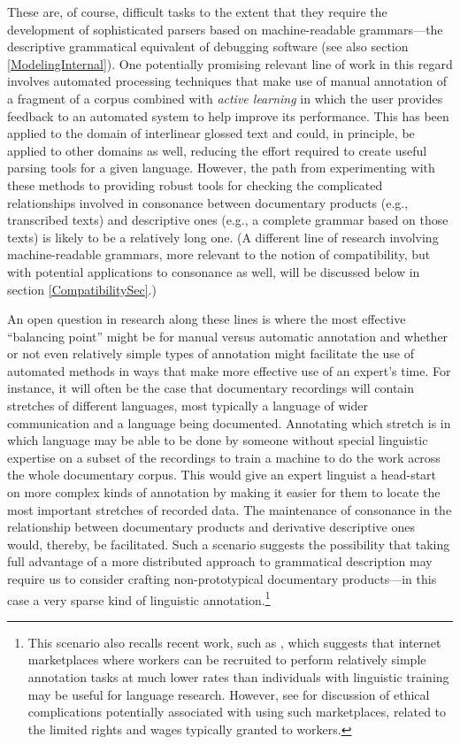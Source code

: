 \documentclass[12pt]{article}
\newcommand{\sref}[1]{section \ref{#1}}
\newcommand\namecite{\citet}
\renewcommand\cite{\citep}
\begin{document}
These are, of course, difficult tasks to the extent that they require the
development of sophisticated parsers based on machine-readable grammars---the
descriptive grammatical equivalent of debugging software (see also
\sref{ModelingInternal}). One potentially promising relevant line of work in
this regard involves automated processing techniques that make use of manual
annotation of a fragment of a corpus combined with \emph{active learning} in
which the user provides feedback to an automated system to help improve its
performance. This has been applied to the domain of interlinear glossed text
\cite{BaldridgePalmer:2009,PalmerEtAl:2009,Palmer:2009,PalmerEtAl:2010} and
could, in principle, be applied to other domains as well, reducing the effort
required to create useful parsing tools for a given language. However, the path
from experimenting with these methods to providing robust tools for checking the
complicated relationships involved in consonance between documentary products
(e.g., transcribed texts) and descriptive ones (e.g., a complete grammar based
on those texts) is likely to be a relatively long one. (A different line of
research involving machine-readable grammars, more relevant to the notion of
compatibility, but with potential applications to consonance as well, will be
discussed below in \sref{CompatibilitySec}.)

An open question in research along these lines is where the most effective
``balancing point'' might be for manual versus automatic annotation and whether
or not even relatively simple types of annotation might facilitate the use of
automated methods in ways that make more effective use of an expert's time. For
instance, it will often be the case that documentary recordings will contain
stretches of different languages, most typically a language of wider
communication and a language being documented. Annotating which stretch is in
which language may be able to be done by someone without special linguistic
expertise on a subset of the recordings to train a machine to do the work across
the whole documentary corpus. This would give an expert linguist a head-start on
more complex kinds of annotation by making it easier for them to locate the most
important stretches of recorded data. The maintenance of consonance in the
relationship between documentary products and derivative descriptive ones would,
thereby, be facilitated. Such a scenario suggests the possibility that taking
full advantage of a more distributed approach to grammatical description may
require us to consider crafting non-prototypical documentary products---in this
case a very sparse kind of linguistic annotation.{\footnote{This scenario also
recalls recent work, such as \namecite{SnowEtAl:2008}, which suggests that
internet marketplaces where workers can be recruited to perform relatively
simple annotation tasks at much lower rates than individuals with linguistic
training may be useful for language research. However, see
\namecite{FortEtAl:2011} for discussion of ethical complications potentially
associated with using such marketplaces, related to the limited rights and wages
typically granted to workers.}}
\end{document}
